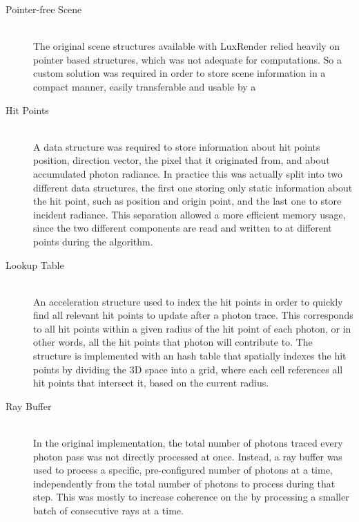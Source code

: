 \documentclass[main.tex]{subfiles}
\begin{document}
\begin{description}
\item[Pointer-free Scene] \hfill \\
  The original scene structures available with LuxRender relied heavily on pointer based structures, which was not adequate for \gpu computations. So a custom solution was required in order to store scene information in a compact manner, easily transferable and usable by a \gpu

\item[Hit Points] \hfill \\
  A data structure was required to store information about hit points position, direction vector, the pixel that it originated from, and about accumulated photon radiance. In practice this was actually split into two different data structures, the first one storing only static information about the hit point, such as position and origin point, and the last one to store incident radiance. This separation allowed a more efficient memory usage, since the two different components are read and written to at different points during the algorithm.

\item[Lookup Table] \hfill \\
  An acceleration structure used to index the hit points in order to quickly find all relevant hit points to update after a photon trace. This corresponds to all hit points within a given radius of the hit point of each photon, or in other words, all the hit points that photon will contribute to. The structure is implemented with an hash table that spatially indexes the hit points by dividing the 3D space into a grid, where each cell references all hit points that intersect it, based on the current radius.

\item[Ray Buffer] \hfill \\
  In the original implementation, the total number of photons traced every photon pass was not directly processed at once. Instead, a ray buffer was used to process a specific, pre-configured number of photons at a time, independently from the total number of photons to process during that step. This was mostly to increase coherence on the \cpu by processing a smaller batch of consecutive rays at a time.

\end{description}
\end{document}
